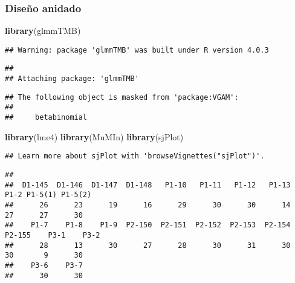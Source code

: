 \documentclass[
]{book}
\newenvironment{Shaded}{\begin{snugshade}}{\end{snugshade}}
\newcommand{\DataTypeTok}[1]{\textcolor[rgb]{0.13,0.29,0.53}{#1}}
\newcommand{\KeywordTok}[1]{\textcolor[rgb]{0.13,0.29,0.53}{\textbf{#1}}}
\newcommand{\NormalTok}[1]{#1}
\newcommand{\OperatorTok}[1]{\textcolor[rgb]{0.81,0.36,0.00}{\textbf{#1}}}
\newcommand{\StringTok}[1]{\textcolor[rgb]{0.31,0.60,0.02}{#1}}
\begin{document}
\hypertarget{diseuxf1o-anidado}{%
\subsubsection{Diseño anidado}\label{diseuxf1o-anidado}}

\begin{Shaded}
\begin{Highlighting}[]
\KeywordTok{library}\NormalTok{(glmmTMB)}
\end{Highlighting}
\end{Shaded}

\begin{verbatim}
## Warning: package 'glmmTMB' was built under R version 4.0.3
\end{verbatim}

\begin{verbatim}
## 
## Attaching package: 'glmmTMB'
\end{verbatim}

\begin{verbatim}
## The following object is masked from 'package:VGAM':
## 
##     betabinomial
\end{verbatim}

\begin{Shaded}
\begin{Highlighting}[]
\KeywordTok{library}\NormalTok{(lme4)}
\KeywordTok{library}\NormalTok{(MuMIn)}
\KeywordTok{library}\NormalTok{(sjPlot)}
\end{Highlighting}
\end{Shaded}

\begin{verbatim}
## Learn more about sjPlot with 'browseVignettes("sjPlot")'.
\end{verbatim}

\begin{Shaded}
\end{Shaded}

\begin{verbatim}
## 
##  D1-145  D1-146  D1-147  D1-148   P1-10   P1-11   P1-12   P1-13    P1-2 P1-5(1) P1-5(2) 
##      26      23      19      16      29      30      30      14      27      27      30 
##    P1-7    P1-8    P1-9  P2-150  P2-151  P2-152  P2-153  P2-154  P2-155    P3-1    P3-2 
##      28      13      30      27      28      30      31      30      30       9      30 
##    P3-6    P3-7 
##      30      30
\end{verbatim}
\end{document}

